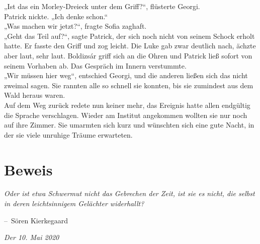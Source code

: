 \documentclass[oneside]{memoir}
\makeatletter
\newenvironment{chapquote}[2][2em]
  {\setlength{\@tempdima}{#1}%
   \def\chapquote@author{#2}%
   \parshape 1 \@tempdima \dimexpr\textwidth-2\@tempdima\relax%
   \itshape}
  {\par\normalfont\hfill--\ \chapquote@author\hspace*{\@tempdima}\par\bigskip}
\makeatother
\begin{document}
\noindent „Ist das ein Morley-Dreieck unter dem Griff?“, flüsterte Georgi. \\
Patrick nickte. „Ich denke schon.“ \\
„Was machen wir jetzt?“, fragte Sofia zaghaft. \\
„Geht das Teil auf?“, sagte Patrick, der sich noch nicht von seinem Schock erholt hatte. Er fasste den Griff und zog leicht. Die Luke gab zwar deutlich nach, ächzte aber laut, sehr laut. Boldizsár griff sich an die Ohren und Patrick ließ sofort von seinem Vorhaben ab. Das Gespräch im Innern verstummte. \\
„Wir müssen hier weg“, entschied Georgi, und die anderen ließen sich das nicht zweimal sagen. Sie rannten alle so schnell sie konnten, bis sie zumindest aus dem Wald heraus waren. \\
Auf dem Weg zurück redete nun keiner mehr, das Ereignis hatte allen endgültig die Sprache verschlagen. Wieder am Institut angekommen wollten sie nur noch auf ihre Zimmer. Sie umarmten sich kurz und wünschten sich eine gute Nacht, in der sie viele unruhige Träume erwarteten.



\chapter{Beweis} %
\begin{chapquote}{Sören Kierkegaard}
\glqq Oder ist etwa Schwermut nicht das Gebrechen der Zeit, ist sie es nicht, die selbst in deren leichtsinnigem Gelächter widerhallt?\grqq
\end{chapquote}

\textit{Der 10. Mai 2020}
\end{document}

